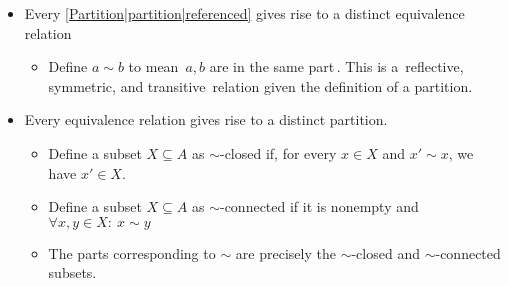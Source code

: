 \begin{itemize}
    \item Every \ref{Partition|partition|referenced} gives rise to a distinct equivalence relation
          \begin{itemize} \item Define $a \sim b$ to mean \,$a,b$ are in the same part\,. This is a \,reflective, symmetric, and transitive\, relation given the definition of a partition.\end{itemize}
    \item Every equivalence relation gives rise to a distinct partition.
    \begin{itemize}
      \item Define a subset $X \subseteq A$ as $\sim$-closed if, for every $x \in X$ and $x' \sim x$, we have $x' \in X$.
    \item Define a subset $X \subseteq A$ as $\sim$-connected if it is nonempty and $\forall x,y \in X:\ x \sim y$
    \item The parts corresponding to $\sim$ are precisely the $\sim$-closed and $\sim$-connected subsets.
  \end{itemize}
\end{itemize}